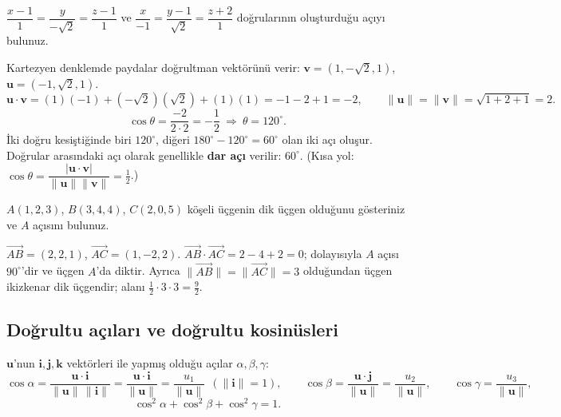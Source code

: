 \begin{soru}
$\dfrac{x-1}{1}=\dfrac{y}{-\sqrt2}=\dfrac{z-1}{1}$ ve $\dfrac{x}{-1}=\dfrac{y-1}{\sqrt2}=\dfrac{z+2}{1}$ doğrularının oluşturduğu açıyı bulunuz.
\end{soru}
\begin{cevap}
Kartezyen denklemde paydalar doğrultman vektörünü verir:
$\mathbf v=(1,-\sqrt2,1)$, \ $\mathbf u=(-1,\sqrt2,1)$.
\[
\mathbf u\cdot\mathbf v=(1)(-1)+(-\sqrt2)(\sqrt2)+(1)(1)=-1-2+1=-2,
\qquad \|\mathbf u\|=\|\mathbf v\|=\sqrt{1+2+1}=2 .
\]
\[
\cos\theta=\frac{-2}{2\cdot2}=-\frac12\ \Rightarrow\ \theta=120^\circ .
\]
İki doğru kesiştiğinde biri $120^\circ$, diğeri $180^\circ-120^\circ=60^\circ$ olan iki açı oluşur. Doğrular arasındaki açı olarak genellikle \textbf{dar açı} verilir: $\boxed{60^\circ}$. (Kısa yol: $\cos\theta=\dfrac{|\mathbf u\cdot\mathbf v|}{\|\mathbf u\|\|\mathbf v\|}=\frac12$.)
\end{cevap}

\begin{soru}
$A(1,2,3)$, $B(3,4,4)$, $C(2,0,5)$ köşeli üçgenin dik üçgen olduğunu gösteriniz ve $A$ açısını bulunuz.
\end{soru}
\begin{cevap}
$\overrightarrow{AB}=(2,2,1)$, $\overrightarrow{AC}=(1,-2,2)$. $\overrightarrow{AB}\cdot\overrightarrow{AC}=2-4+2=0$; dolayısıyla $A$ açısı $90^\circ$'dir ve üçgen $A$'da diktir. Ayrıca $\|\overrightarrow{AB}\|=\|\overrightarrow{AC}\|=3$ olduğundan üçgen ikizkenar dik üçgendir; alanı $\frac12\cdot3\cdot3=\frac92$.
\end{cevap}

\subsection{Doğrultu açıları ve doğrultu kosinüsleri}

\begin{tahta}
$\mathbf u$'nun $\mathbf i,\mathbf j,\mathbf k$ vektörleri ile yapmış olduğu açılar $\alpha,\beta,\gamma$:
\[
\cos\alpha=\frac{\mathbf u\cdot\mathbf i}{\|\mathbf u\|\,\|\mathbf i\|}=\frac{\mathbf u\cdot\mathbf i}{\|\mathbf u\|}=\frac{u_1}{\|\mathbf u\|}\ \ (\|\mathbf i\|=1),\qquad
\cos\beta=\frac{\mathbf u\cdot\mathbf j}{\|\mathbf u\|}=\frac{u_2}{\|\mathbf u\|},\qquad
\cos\gamma=\frac{u_3}{\|\mathbf u\|},
\]
\[
\cos^2\alpha+\cos^2\beta+\cos^2\gamma=1 .
\]
\end{tahta}

